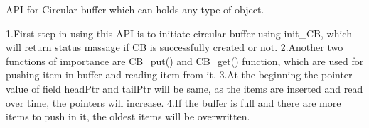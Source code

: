 A\+PI for Circular buffer which can holds any type of object.

1.\+First step in using this A\+PI is to initiate circular buffer using init\+\_\+\+CB, which will return status massage if CB is successfully created or not. 2.\+Another two functions of importance are \mbox{\hyperlink{circular__buffer_8h_a0cd402749c474cfcd32b155e2e10ffd3}{C\+B\+\_\+put()}} and \mbox{\hyperlink{circular__buffer_8h_ada7f8b98a82080f6184b70bc1bd82b91}{C\+B\+\_\+get()}} function, which are used for pushing item in buffer and reading item from it. 3.\+At the beginning the pointer value of field head\+Ptr and tail\+Ptr will be same, as the items are inserted and read over time, the pointers will increase. 4.\+If the buffer is full and there are more items to push in it, the oldest items will be overwritten. 